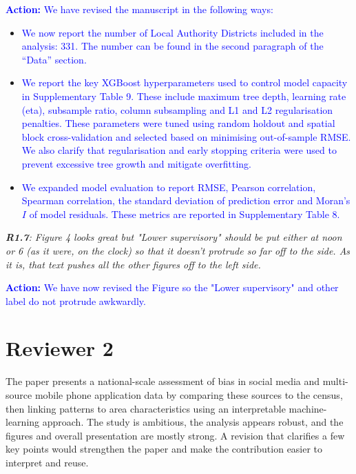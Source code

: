 \documentclass[
  letterpaper,
  DIV=11,
  numbers=noendperiod]{scrartcl}
\begin{document}
\setlength{\leftskip}{0.5cm}\textcolor{blue}{\textbf{Action:} We have revised the manuscript in the following ways:}

\vspace{-3mm} \begin{itemize}[noitemsep, topsep=0pt]
\item \textcolor{blue}{We now report the number of Local Authority Districts included in the analysis: 331. The number can be found in the second paragraph of the ``Data'' section.}
\item \textcolor{blue}{We report the key XGBoost hyperparameters used to control model capacity in Supplementary Table 9. These include maximum tree depth, learning rate (eta), subsample ratio, column subsampling and L1 and L2 regularisation penalties. These parameters were tuned using random holdout and spatial block cross-validation and selected based on minimising out-of-sample RMSE. We also clarify that regularisation and early stopping criteria were used to prevent excessive tree growth and mitigate overfitting. }
\item \textcolor{blue}{We expanded model evaluation to report RMSE, Pearson correlation, Spearman correlation, the standard deviation of prediction error and Moran’s $I$ of model residuals. These metrics are reported in Supplementary Table 8.}
\end{itemize}

\setlength{\leftskip}{0cm}\textit{\textbf{R1.7}: Figure 4 looks great but "Lower supervisory" should be put either at noon or 6 (as it were, on the clock) so that it doesn’t protrude so far off to the side. As it is, that text pushes all the other figures off to the left side.}

\setlength{\leftskip}{0.5cm}\textcolor{blue}{\textbf{Action:} We have now revised the Figure so the "Lower supervisory" and other label do not protrude awkwardly.}

\section{Reviewer 2}

The paper presents a national-scale assessment of bias in social media
and multi-source mobile phone application data by comparing these
sources to the census, then linking patterns to area characteristics
using an interpretable machine-learning approach. The study is
ambitious, the analysis appears robust, and the figures and overall
presentation are mostly strong. A revision that clarifies a few key
points would strengthen the paper and make the contribution easier to
interpret and reuse.
\end{document}
